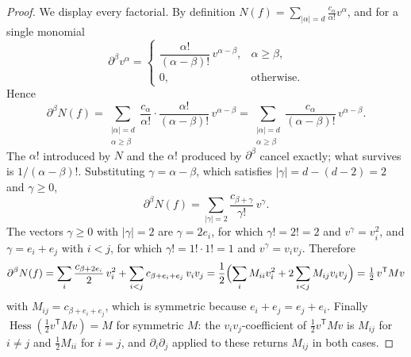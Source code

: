 \documentclass[11pt]{article}
\theoremstyle{plain}
\theoremstyle{definition}
\DeclareMathOperator{\Hess}{Hess}
\begin{document}
\begin{proof}
We display every factorial. By definition
$N(f)=\sum_{|\alpha|=d}\frac{c_\alpha}{\alpha!}v^\alpha$, and for a single monomial
\[
  \partial^\beta v^\alpha=
  \begin{cases}
    \dfrac{\alpha!}{(\alpha-\beta)!}\,v^{\alpha-\beta}, & \alpha\ge\beta,\\[2pt]
    0,&\text{otherwise.}
  \end{cases}
\]
Hence
\[
  \partial^\beta N(f)=\sum_{\substack{|\alpha|=d\\ \alpha\ge\beta}}
  \frac{c_\alpha}{\alpha!}\cdot\frac{\alpha!}{(\alpha-\beta)!}\,v^{\alpha-\beta}
  =\sum_{\substack{|\alpha|=d\\ \alpha\ge\beta}}\frac{c_\alpha}{(\alpha-\beta)!}\,v^{\alpha-\beta}.
\]
The $\alpha!$ introduced by $N$ and the $\alpha!$ produced by $\partial^\beta$ cancel
exactly; what survives is $1/(\alpha-\beta)!$. Substituting $\gamma=\alpha-\beta$, which
satisfies $|\gamma|=d-(d-2)=2$ and $\gamma\ge0$,
\[
  \partial^\beta N(f)=\sum_{|\gamma|=2}\frac{c_{\beta+\gamma}}{\gamma!}\,v^\gamma .
\]
The vectors $\gamma\ge0$ with $|\gamma|=2$ are $\gamma=2e_i$, for which $\gamma!=2!=2$ and
$v^\gamma=v_i^2$, and $\gamma=e_i+e_j$ with $i<j$, for which $\gamma!=1!\cdot1!=1$ and
$v^\gamma=v_iv_j$. Therefore
\[
  \partial^\beta N(f)
  =\sum_{i}\frac{c_{\beta+2e_i}}{2}\,v_i^2+\sum_{i<j}c_{\beta+e_i+e_j}\,v_iv_j
  =\frac12\Bigl(\sum_iM_{ii}v_i^2+2\sum_{i<j}M_{ij}v_iv_j\Bigr)
  =\tfrac12\,v^{\mathsf T}Mv
\]
with $M_{ij}=c_{\beta+e_i+e_j}$, which is symmetric because $e_i+e_j=e_j+e_i$. Finally
$\Hess(\tfrac12v^{\mathsf T}Mv)=M$ for symmetric $M$: the $v_iv_j$-coefficient of
$\tfrac12v^{\mathsf T}Mv$ is $M_{ij}$ for $i\ne j$ and $\tfrac12M_{ii}$ for $i=j$, and
$\partial_i\partial_j$ applied to these returns $M_{ij}$ in both cases.
\end{proof}
\end{document}

